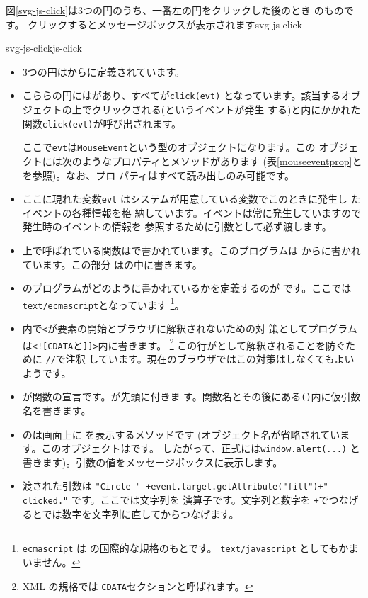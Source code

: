 図\ref{svg-js-click}は3つの円のうち、一番左の円をクリックした後のとき
のものです。
{クリックするとメッセージボックスが表示されます}{svg-js-click}

    {svg-js-click}{js-click}
\begin{itemize}
 \item 3つの円はからに定義されています。
 \item こららの円にはがあり、すべてが\texttt{click(evt)}
 となっています。該当するオブジェクトの上でクリックされる(というイベントが発生
 する)と\JS 内にかかれた関数\texttt{click(evt)}が呼び出されます。

ここで\texttt{evt}は\texttt{MouseEvent}という型のオブジェクトになります。この
オブジェクトには次のようなプロパティとメソッドがあります
(表\ref{mouseeventprop}と\cite[AppendixC]{DOM2Event}を参照)。なお、プロ
       パティはすべて読み出しのみ可能です。

 \item ここに現れた変数\texttt{evt}
はシステムが用意している変数でこのときに発生し
 たイベントの各種情報を格
 納しています。イベントは常に発生していますので発生時のイベントの情報を
 参照するために引数として必ず渡します。
 \item 上で呼ばれている関数は\JS で書かれています。このプログラムは
       からに書かれています。この部分
       はの中に書きます。
 \item {}のプログラムがどのように書かれているかを定義するのが
 です。ここでは\texttt{text/ecmascript}となっています
       \footnote{\texttt{ecmascript} は \JS の国際的な規格のもとです。
       \texttt{text/javascript} としてもかまいません。}。
 \item \JS 内で\texttt{<}が要素の開始とブラウザに解釈されないための対
       策としてプログラムは\verb+<![CDATA+と\verb+]]>+内に書きます。
       \footnote{XML の規格では \texttt{CDATA}セクションと呼ばれます。}
       この行が\JS として解釈されることを防ぐために \texttt{//}で注釈
       しています。現在のブラウザではこの対策はしなくてもよいようです。 
 \item {}が関数の宣言です。が先頭に付きま
       す。関数名とその後にある\texttt{()}内に仮引数名を書きます。
 \item {}のは画面上に
       を表示するメソッドです
 (オブジェクト名が省略されています。このオブジェクトはです。
       したがって、正式には\texttt{window.alert(...)}
 と書きます)。引数の値をメッセージボックスに表示します。
 \item 渡された引数は
       \verb#"Circle " +event.target.getAttribute("fill")+" clicked."#
      です。ここで\ElmJ{\texttt{+}}は文字列を
       演算子です。文字列と数字を
       \texttt{+}でつなげると\JS では数字を文字列に直してからつなげます。


\end{itemize}
